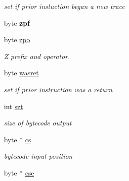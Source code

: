 \begin{DoxyCompactItemize}
\begin{DoxyCompactList}\small\item\em set if prior instuction began a new trace \end{DoxyCompactList}\item 
\hypertarget{structBS2CC__CcFrame__s_a3a5eac6f4c40e5f7f7428e2f0e9b9df8}{byte {\bfseries zpf}}\label{structBS2CC__CcFrame__s_a3a5eac6f4c40e5f7f7428e2f0e9b9df8}

\item 
\hypertarget{structBS2CC__CcFrame__s_a6a65c814e9da634d0950cde829b183a0}{byte \hyperlink{structBS2CC__CcFrame__s_a6a65c814e9da634d0950cde829b183a0}{zpo}}\label{structBS2CC__CcFrame__s_a6a65c814e9da634d0950cde829b183a0}

\begin{DoxyCompactList}\small\item\em Z prefix and operator. \end{DoxyCompactList}\item 
\hypertarget{structBS2CC__CcFrame__s_a9a76c63b73711f7fd64dfabcc83235ed}{byte \hyperlink{structBS2CC__CcFrame__s_a9a76c63b73711f7fd64dfabcc83235ed}{wasret}}\label{structBS2CC__CcFrame__s_a9a76c63b73711f7fd64dfabcc83235ed}

\begin{DoxyCompactList}\small\item\em set if prior instruction was a return \end{DoxyCompactList}\item 
\hypertarget{structBS2CC__CcFrame__s_aa9dfaa208758d91b66d9409add0fde32}{int \hyperlink{structBS2CC__CcFrame__s_aa9dfaa208758d91b66d9409add0fde32}{szt}}\label{structBS2CC__CcFrame__s_aa9dfaa208758d91b66d9409add0fde32}

\begin{DoxyCompactList}\small\item\em size of bytecode output \end{DoxyCompactList}\item 
\hypertarget{structBS2CC__CcFrame__s_a1b22380daeb2b32e1b38c9b9fea8502b}{byte $\ast$ \hyperlink{structBS2CC__CcFrame__s_a1b22380daeb2b32e1b38c9b9fea8502b}{cs}}\label{structBS2CC__CcFrame__s_a1b22380daeb2b32e1b38c9b9fea8502b}

\begin{DoxyCompactList}\small\item\em bytecode input position \end{DoxyCompactList}\item 
\hypertarget{structBS2CC__CcFrame__s_a030aea640b9ef2ea71ac89c998f6e2fa}{byte $\ast$ \hyperlink{structBS2CC__CcFrame__s_a030aea640b9ef2ea71ac89c998f6e2fa}{cse}}\label{structBS2CC__CcFrame__s_a030aea640b9ef2ea71ac89c998f6e2fa}


\end{DoxyCompactItemize}
